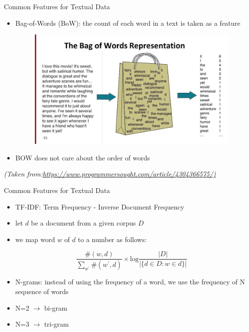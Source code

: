 \begin{frame}{Common Features for Textual Data}
    \begin{itemize}
        \item<1-> Bag-of-Words (BoW): the count of each word in a text is taken as a feature
            \begin{figure}
                \centering
                \includegraphics[scale=0.25]{./figure/bow.jpg}
            \end{figure}
    \item<2-> BOW does not care about the order of words
    \end{itemize}
    
    
    \vspace*{\fill}
     \textit{\tiny{(Taken from:\url{https://www.programmersought.com/article/4304366575/)}}}
\end{frame}
\begin{frame}{Common Features for Textual Data}
    \begin{itemize}
        \item<1-> TF-IDF: Term Frequency - Inverse Document Frequency
        \item<2-> let $d$ be a document from a given corpus $D$
        \item<3-> we map word $w$ of $d$ to a number as follows:
        
        \begin{equation*}
            \frac{\#(w,d)}{\sum_{w^\prime}  \#(w^\prime, d)} \times \text{log}\frac{|D|}{|\{ d\in D: w \in d\}|}
        \end{equation*}
        \item<4-> N-grams: instead of using the frequency of a word, we use the frequency of N sequence of words 
        \item<5-> N=2 $\rightarrow$ bi-gram 
        \item<6-> N=3 $\rightarrow$ tri-gram
    \end{itemize}
\end{frame}
